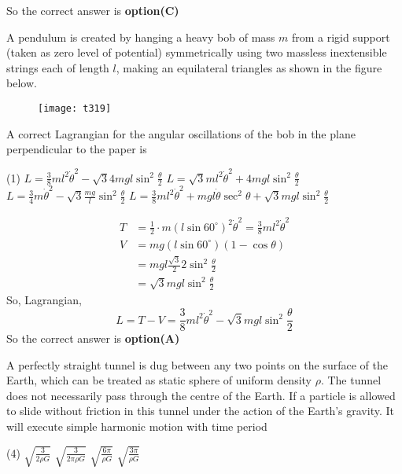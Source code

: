 \begin{questions}
\begin{answer}
	So the correct answer is \textbf{option(C)}
\end{answer}
\begin{minipage}{\textwidth}
	\question A pendulum is created by hanging a heavy bob of mass $m$ from a rigid support (taken as zero level of potential) symmetrically using two massless inextensible strings each of length $l$, making an equilateral triangles as shown in the figure below.\\
	\begin{figure}[H]
		\centering
		\texttt{[image: t319]}
	\end{figure}
	A correct Lagrangian for the angular oscillations of the bob in the plane perpendicular to the paper is
\end{minipage}
\begin{tasks}(1)
	\task[\textbf{A.}] $L=\frac{3}{8} m l^{2} \dot{\theta}^{2}-\sqrt{3} 4 m g l \sin ^{2} \frac{\theta}{2}$
	\task[\textbf{B.}]   $L=\sqrt{3} m l^{2} \dot{\theta}^{2}+4 m g l \sin ^{2} \frac{\theta}{2}$
	\task[\textbf{C.}] $L=\frac{3}{4} m \dot{\theta}^{2}-\sqrt{3} \frac{m g}{l} \sin ^{2} \frac{\theta}{2}$
	\task[\textbf{D.}] $L=\frac{3}{8} m l^{2} \dot{\theta}^{2}+m g l \dot{\theta} \sec ^{2} \theta+\sqrt{3} m g l \sin ^{2} \frac{\theta}{2}$
\end{tasks}
\begin{answer}
	$$
	\begin{aligned}
	T &=\frac{1}{2} \cdot m\left(l \sin 60^{\circ}\right)^{2} \dot{\theta}^{2}=\frac{3}{8} m l^{2} \dot{\theta}^{2} \\
	V &=m g\left(l \sin 60^{\circ}\right)(1-\cos \theta) \\
	&=m g l \frac{\sqrt{3}}{2} 2 \sin ^{2} \frac{\theta}{2} \\
	&=\sqrt{3} m g l \sin ^{2} \frac{\theta}{2}
	\end{aligned}
	$$
	So, Lagrangian,
	$$
	L=T-V=\frac{3}{8} m l^{2} \dot{\theta}^{2}-\sqrt{3} m g l \sin ^{2} \frac{\theta}{2}
	$$
	So the correct answer is \textbf{option(A)}
\end{answer}
\begin{minipage}{\textwidth}
	\question A perfectly straight tunnel is dug between any two points on the surface of the Earth, which can be treated as static sphere of uniform density $\rho$. The tunnel does not necessarily pass through the centre of the Earth. If a particle is allowed to slide without friction in this tunnel under the action of the Earth's gravity. It will execute simple harmonic motion with time period
\end{minipage}
\begin{tasks}(4)
	\task[\textbf{A.}]   $\sqrt{\frac{3}{2 \rho G}}$
	\task[\textbf{B.}]   $\sqrt{\frac{3}{2 \pi \rho G}}$
	\task[\textbf{C.}] $\sqrt{\frac{6 \pi}{\rho G}}$
	\task[\textbf{D.}] $\sqrt{\frac{3 \pi}{\rho G}}$
\end{tasks}
\begin{answer}
	

\end{answer}
\end{questions}
